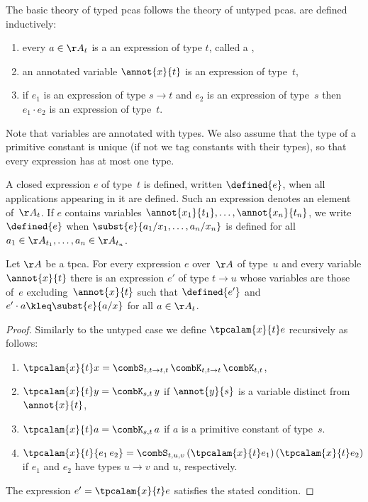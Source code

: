 The basic theory of typed pcas follows the theory of untyped pcas.
 are defined inductively:
%
\begin{enumerate}
\item every $a \in \AA_t$ is a an expression of type $t$, called a
  ,
\item an annotated variable $\annot{x}{t}$ is an expression of type~$t$,
\item if $e_1$ is an expression of type $s \to t$ and $e_2$ is an
  expression of type~$s$ then $e_1 \cdot e_2$ is an expression of
  type~$t$.
\end{enumerate}
%
Note that variables are annotated with types. We also
assume that the type of a primitive constant is unique (if not we tag
constants with their types), so that every expression has at most one type.

A closed expression $e$ of type~$t$ is defined, written $\defined{e}$,
when all applications appearing in it are defined. Such an expression
denotes an element of~$\AA_t$. If $e$ contains variables
$\annot{x_1}{t_1}, \ldots, \annot{x_n}{t_n}$, we write $\defined{e}$
when $\subst{e}{a_1/x_1, \ldots, a_n/x_n}$ is defined
for all $a_1 \in \AA_{t_1}, \ldots, a_n \in \AA_{t_n}$.

\begin{theorem}
  Let $\AA$ be a tpca. For every expression $e$ over~$\AA$ of type~$u$ and
  every variable $\annot{x}{t}$ there is an expression $e'$ of type $t
  \to u$ whose variables are those of~$e$ excluding~$\annot{x}{t}$
  such that $\defined{e'}$ and $e' \cdot a \kleq \subst{e}{a/x}$ for all $a \in \AA_t$.
\end{theorem}

\begin{proof}
  Similarly to the untyped case we define $\tpcalam{x}{t} e$ recursively as follows:
  \begin{enumerate}
  \item $\tpcalam{x}{t} x = \combS_{t,t \to t,t} \, \combK_{t,t \to
      t} \, \combK_{t,t}$,
  \item $\tpcalam{x}{t} y = \combK_{s,t}\, y$ if $\annot{y}{s}$ is a
    variable distinct from $\annot{x}{t}$,
  \item $\tpcalam{x}{t} a = \combK_{s,t} \, a$ if $a$ is a primitive
    constant of type~$s$.
  \item $\tpcalam{x}{t} {e_1\, e_2} = \combS_{t,u,v}\,
    (\tpcalam{x}{t} e_1) \, (\tpcalam{x}{t} e_2)$ if $e_1$ and
    $e_2$ have types $u \to v$ and $u$, respectively.
  \end{enumerate}
  The expression $e' = \tpcalam{x}{t} e$ satisfies the stated condition.
\end{proof}

